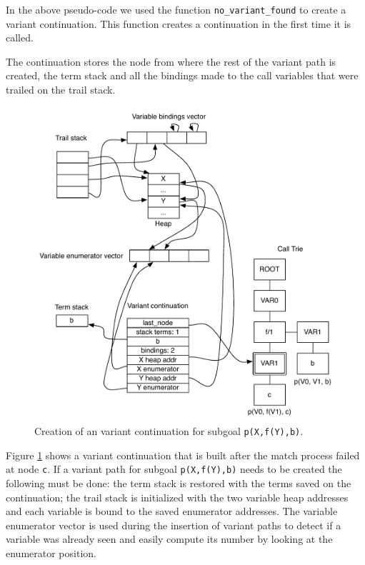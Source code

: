 In the above pseudo-code we used the function \texttt{no\_variant\_found} to create
a variant continuation. This function creates a continuation in the first time it is called.

The continuation stores the node from where the rest of the variant path is created,
the term stack and all the bindings made to the call variables
that were trailed on the trail stack.

\begin{figure}[ht]
  \centering
    \includegraphics[scale=0.6]{variant_continuation.pdf}
  \caption{Creation of an variant continuation for subgoal \texttt{p(X,f(Y),b)}.}
  \label{fig:variant_continuation}
\end{figure}

Figure \ref{fig:variant_continuation} shows a variant continuation that is built
after the match process failed at node \texttt{c}. If a variant path
for subgoal \texttt{p(X,f(Y),b)} needs to be created the following must be done:
the term stack is restored with the terms saved on the continuation; the trail stack is initialized with
the two variable heap addresses and each variable is bound to the saved
enumerator addresses. The variable enumerator vector is used during the insertion
of variant paths to detect if a variable was already seen and easily compute its number by
looking at the enumerator position. 

